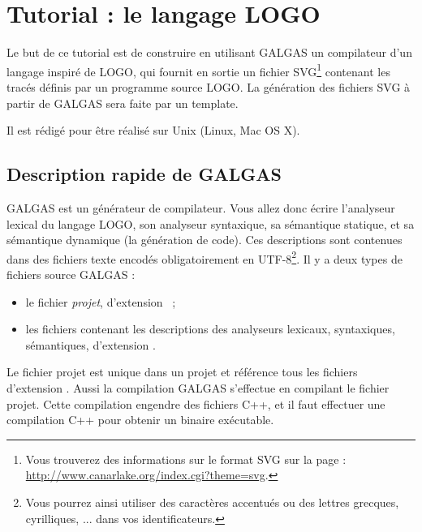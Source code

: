 
\chapter{Tutorial : le langage LOGO}


Le but de ce tutorial est de construire en utilisant GALGAS un compilateur d’un langage inspiré de LOGO, qui fournit en sortie un fichier SVG\footnote{Vous trouverez des informations sur le format SVG sur la page : \url{http://www.canarlake.org/index.cgi?theme=svg}.} contenant les tracés définis par un programme source LOGO. La génération des fichiers SVG à partir de GALGAS sera faite par un template.


Il est rédigé pour être réalisé sur Unix (Linux, Mac OS X).




\section{Description rapide de GALGAS}

GALGAS est un générateur de compilateur. Vous allez donc écrire l'analyseur lexical du langage LOGO, son analyseur syntaxique, sa sémantique statique, et sa sémantique dynamique (la génération de code). Ces descriptions sont contenues dans des fichiers texte encodés obligatoirement en UTF-8\footnote{Vous pourrez ainsi utiliser des caractères accentués ou des lettres grecques, cyrilliques, ... dans vos identificateurs.}. Il y a deux types de fichiers source GALGAS :
\begin{itemize}
\item le fichier \emph{projet}, d'extension ~;
\item les fichiers contenant les descriptions des analyseurs lexicaux, syntaxiques, sémantiques, d'extension .
\end{itemize}

Le fichier projet est unique dans un projet et référence tous les fichiers d'extension . Aussi la compilation GALGAS s'effectue en compilant le fichier projet. Cette compilation engendre des fichiers C++, et il faut effectuer une compilation C++ pour obtenir un binaire exécutable.

